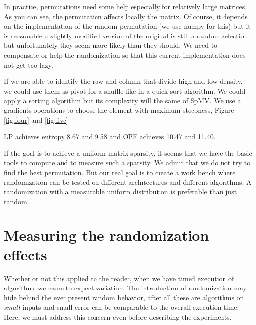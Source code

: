 \documentclass[manuscript,screen]{acmart}
\begin{document}

In practice, permutations need some help especially for relatively
large matrices. As you can see, the permutation affects locally the
matrix. Of course, it depends on the implementation of the random
permutation (we use numpy for this) but it is reasonable a slightly
modified version of the original is still a random selection but
unfortunately they seem more likely than they should. We need to
compensate or help the randomization so that this current
implementation does not get too lazy.

If we are able to identify the row and column that divide high and low
density, we could use them as pivot for a shuffle like in a quick-sort
algorithm. We could apply a sorting algorithm but its complexity will
the same of SpMV. We use a gradients operations to choose the element
with maximum steepness, Figure \ref{fig:four} and \ref{fig:five}

LP achieves entropy 8.67 and 9.58 and OPF achieves 10.47 and 11.40.



If the goal is to achieve a uniform matrix sparsity, it seems that we
have the basic tools to compute and to measure such a sparsity. We
admit that we do not try to find the best permutation. But our real
goal is to create a work bench where randomization can be tested on
different architectures and different algorithms. A randomization with
a measurable uniform distribution is preferable than just random.

\section{Measuring the randomization effects}
\label{sec:measuring}

Whether or not this applied to the reader, when we have timed
execution of algorithms we came to expect variation.  The introduction
of randomization may hide behind the ever present random behavior,
after all these are algorithms on {\em small} inputs and small error
can be comparable to the overall execution time. Here, we must address
this concern even before describing the experiments.
\end{document}
